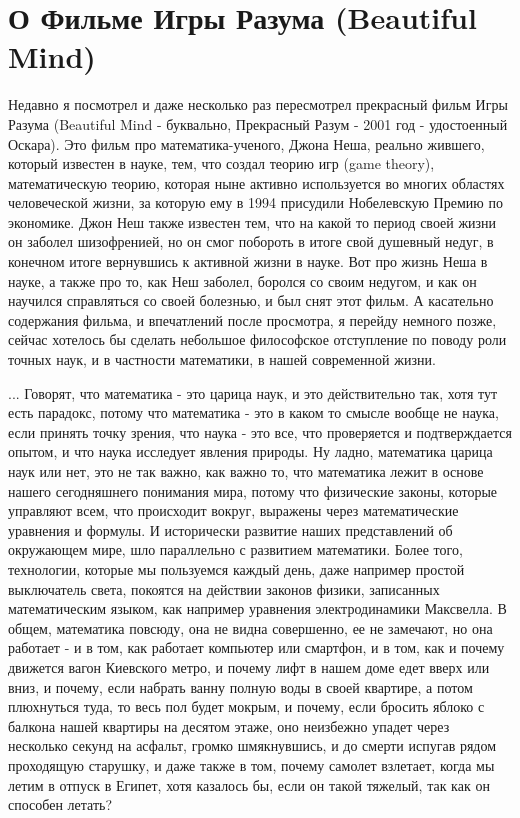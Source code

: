 
 
 
 
 

\section{О Фильме Игры Разума (Beautiful Mind)}

Недавно я посмотрел и даже несколько раз пересмотрел прекрасный фильм Игры
Разума (Beautiful Mind - буквально, Прекрасный Разум - 2001 год - удостоенный
Оскара).  Это фильм про математика-ученого, Джона Неша, реально жившего,
который известен в науке, тем, что создал теорию игр (game theory),
математическую теорию, которая ныне активно используется во многих областях
человеческой жизни, за которую ему в 1994 присудили Нобелевскую Премию по
экономике.  Джон Неш также известен тем, что на какой то период своей жизни он
заболел шизофренией, но он смог побороть в итоге свой душевный недуг, в
конечном итоге вернувшись к активной жизни в науке. Вот про жизнь Неша в науке,
а также про то, как Неш заболел, боролся со своим недугом, и как он научился
справляться со своей болезнью, и был снят этот фильм. А касательно содержания
фильма, и впечатлений после просмотра, я перейду немного позже, сейчас хотелось
бы сделать небольшое философское отступление по поводу роли точных наук, и в
частности математики, в нашей современной жизни.

... Говорят, что математика - это царица наук, и это действительно так, хотя
тут есть парадокс, потому что математика - это в каком то смысле вообще не
наука, если принять точку зрения, что наука - это все, что проверяется и
подтверждается опытом, и что наука исследует явления природы. Ну ладно,
математика царица наук или нет, это не так важно, как важно то, что математика
лежит в основе нашего сегодняшнего понимания мира, потому что физические
законы, которые управляют всем, что происходит вокруг, выражены через
математические уравнения и формулы. И исторически развитие наших представлений
об окружающем мире, шло параллельно с развитием математики.  Более того,
технологии, которые мы пользуемся каждый день, даже например простой
выключатель света, покоятся на действии законов физики, записанных
математическим языком, как например уравнения электродинамики Максвелла.  В
общем, математика повсюду, она не видна совершенно, ее не замечают, но она
работает - и в том, как работает компьютер или смартфон, и в том, как и почему
движется вагон Киевского метро, и почему лифт в нашем доме едет вверх или вниз,
и почему, если набрать ванну полную воды в своей квартире, а потом плюхнуться
туда, то весь пол будет мокрым, и почему, если бросить яблоко с балкона нашей
квартиры на десятом этаже, оно неизбежно упадет через несколько секунд на
асфальт, громко шмякнувшись, и до смерти испугав рядом проходящую старушку, и
даже также в том, почему самолет взлетает, когда мы летим в отпуск в Египет,
хотя казалось бы, если он такой тяжелый, так как он способен летать? 

